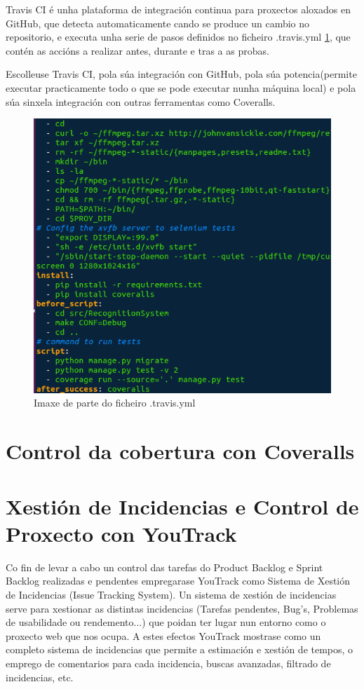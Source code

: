     Travis CI é unha plataforma de integración continua para proxectos aloxados en GitHub, que 
    detecta automaticamente cando se produce un cambio no repositorio, e executa unha serie de pasos 
    definidos no ficheiro .travis.yml \ref{fig:travisYml}, que contén as accións a realizar 
    antes, durante e tras a as probas.
    
    Escolleuse Travis CI, pola súa integración con GitHub, pola súa potencia(permite executar 
    practicamente todo o que se pode executar nunha máquina local) e pola súa sinxela integración
    con outras ferramentas como Coveralls.
    
    \begin{figure}[htp]
    \begin{center}
        \includegraphics[scale=0.6]{figures/travisYml.png}
        \caption{Imaxe de parte do ficheiro .travis.yml}
    \label{fig:travisYml}
    \end{center}
    \end{figure}
    
    
\section{Control da cobertura con Coveralls}

\section{Xestión de Incidencias e Control de Proxecto con YouTrack}
    Co fin de levar a cabo un control das tarefas do Product Backlog e Sprint Backlog realizadas e 
    pendentes empregarase YouTrack como Sistema de Xestión de Incidencias (Issue Tracking System). 
    Un sistema de xestión de incidencias serve para xestionar as distintas incidencias (Tarefas 
    pendentes, Bug's, Problemas de usabilidade ou rendemento...) que poidan ter lugar nun entorno 
    como o proxecto web que nos ocupa. A estes efectos YouTrack mostrase como un completo sistema 
    de incidencias que permite a estimación e xestión de tempos, o emprego de comentarios para cada
    incidencia, buscas avanzadas, filtrado de incidencias, etc.
    
